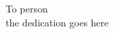 \begin{dedication}
    \null\vfil
    \begin{center}
        To person\\\vspace{12pt}
        the dedication goes here
    \end{center}
    \vfil\null
\end{dedication}